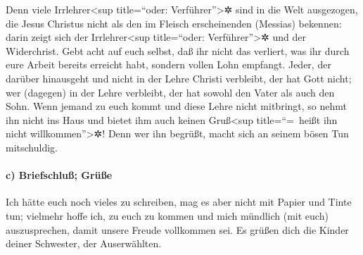  Denn viele Irrlehrer\textless sup title=``oder:
Verführer''\textgreater✲ sind in die Welt ausgezogen, die Jesus Christus
nicht als den im Fleisch erscheinenden (Messias) bekennen: darin zeigt
sich der Irrlehrer\textless sup title=``oder: Verführer''\textgreater✲
und der Widerchrist.  Gebt acht auf euch selbst, daß ihr
nicht das verliert, was ihr durch eure Arbeit bereits erreicht habt,
sondern vollen Lohn empfangt.  Jeder, der darüber
hinausgeht und nicht in der Lehre Christi verbleibt, der hat Gott nicht;
wer (dagegen) in der Lehre verbleibt, der hat sowohl den Vater als auch
den Sohn.  Wenn jemand zu euch kommt und diese Lehre
nicht mitbringt, so nehmt ihn nicht ins Haus und bietet ihm auch keinen
Gruß\textless sup title=``=~heißt ihn nicht willkommen''\textgreater✲!
 Denn wer ihn begrüßt, macht sich an seinem bösen Tun
mitschuldig.

\hypertarget{c-briefschluuxdf-gruxfcuxdfe}{%
\paragraph{c) Briefschluß; Grüße}\label{c-briefschluuxdf-gruxfcuxdfe}}

 Ich hätte euch noch vieles zu schreiben, mag es aber
nicht mit Papier und Tinte tun; vielmehr hoffe ich, zu euch zu kommen
und mich mündlich (mit euch) auszusprechen, damit unsere Freude
vollkommen sei.  Es grüßen dich die Kinder deiner
Schwester, der Auserwählten.
